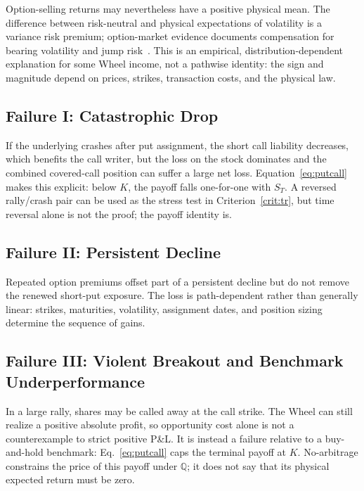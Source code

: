 \documentclass[aps,pra,reprint,superscriptaddress,amsmath,amssymb,floatfix]{revtex4-2}
\theoremstyle{plain}
\theoremstyle{definition}
\theoremstyle{remark}
\begin{document}
Option-selling returns may nevertheless have a positive physical mean. The
difference between risk-neutral and physical expectations of volatility is a
variance risk premium; option-market evidence documents compensation for
bearing volatility and jump risk~\cite{BakshiKapadia2003,CarrWu2009}. This is
an empirical, distribution-dependent explanation for some Wheel income, not a
pathwise identity: the sign and magnitude depend on prices, strikes,
transaction costs, and the physical law.

\subsection{Failure I: Catastrophic Drop}

If the underlying crashes after put assignment, the short call liability
decreases, which benefits the call writer, but the loss on the stock dominates
and the combined covered-call position can suffer a large net loss.
Equation~\eqref{eq:putcall} makes this explicit: below \(K\), the payoff falls
one-for-one with \(S_T\). A reversed rally/crash pair can be used as the stress
test in Criterion~\ref{crit:tr}, but time reversal alone is not the proof; the
payoff identity is.

\subsection{Failure II: Persistent Decline}

Repeated option premiums offset part of a persistent decline but do not remove
the renewed short-put exposure. The loss is path-dependent rather than
generally linear: strikes, maturities, volatility, assignment dates, and
position sizing determine the sequence of gains.

\subsection{Failure III: Violent Breakout and Benchmark Underperformance}

In a large rally, shares may be called away at the call strike. The Wheel can
still realize a positive absolute profit, so opportunity cost alone is not a
counterexample to strict positive P\&L. It is instead a failure relative to a
buy-and-hold benchmark: Eq.~\eqref{eq:putcall} caps the terminal payoff at
\(K\). No-arbitrage constrains the price of this payoff under
\(\mathbb{Q}\); it does not say that its physical expected return must be zero.
\end{document}
